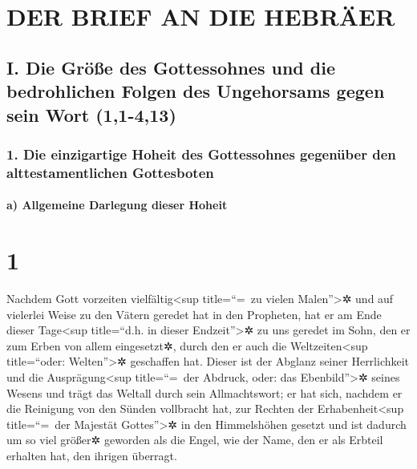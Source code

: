 \hypertarget{der-brief-an-die-hebruxe4er}{%
\section{DER BRIEF AN DIE HEBRÄER}\label{der-brief-an-die-hebruxe4er}}

\hypertarget{i.-die-gruxf6uxdfe-des-gottessohnes-und-die-bedrohlichen-folgen-des-ungehorsams-gegen-sein-wort-11-413}{%
\subsection{I. Die Größe des Gottessohnes und die bedrohlichen Folgen
des Ungehorsams gegen sein Wort
(1,1-4,13)}\label{i.-die-gruxf6uxdfe-des-gottessohnes-und-die-bedrohlichen-folgen-des-ungehorsams-gegen-sein-wort-11-413}}

\hypertarget{die-einzigartige-hoheit-des-gottessohnes-gegenuxfcber-den-alttestamentlichen-gottesboten}{%
\subsubsection{1. Die einzigartige Hoheit des Gottessohnes gegenüber den
alttestamentlichen
Gottesboten}\label{die-einzigartige-hoheit-des-gottessohnes-gegenuxfcber-den-alttestamentlichen-gottesboten}}

\hypertarget{a-allgemeine-darlegung-dieser-hoheit}{%
\paragraph{a) Allgemeine Darlegung dieser
Hoheit}\label{a-allgemeine-darlegung-dieser-hoheit}}

\hypertarget{section}{%
\section{1}\label{section}}

 Nachdem Gott vorzeiten vielfältig\textless sup
title=``=~zu vielen Malen''\textgreater✲ und auf vielerlei Weise zu den
Vätern geredet hat in den Propheten,  hat er am Ende
dieser Tage\textless sup title=``d.h. in dieser Endzeit''\textgreater✲
zu uns geredet im Sohn, den er zum Erben von allem eingesetzt✲, durch
den er auch die Weltzeiten\textless sup title=``oder:
Welten''\textgreater✲ geschaffen hat.  Dieser ist der
Abglanz seiner Herrlichkeit und die Ausprägung\textless sup
title=``=~der Abdruck, oder: das Ebenbild''\textgreater✲ seines Wesens
und trägt das Weltall durch sein Allmachtswort; er hat sich, nachdem er
die Reinigung von den Sünden vollbracht hat, zur Rechten der
Erhabenheit\textless sup title=``=~der Majestät Gottes''\textgreater✲ in
den Himmelshöhen gesetzt  und ist dadurch um so viel
größer✲ geworden als die Engel, wie der Name, den er als Erbteil
erhalten hat, den ihrigen überragt.

